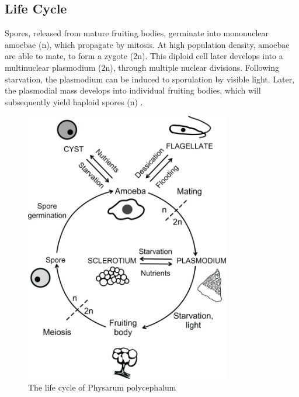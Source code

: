 \subsection{Life Cycle}
Spores, released from mature fruiting bodies, germinate into mononuclear amoebae (n), which propagate by mitosis. At high population density, amoebae are able to mate, to form a zygote (2n). This diploid cell later develops into a multinuclear plasmodium (2n), through multiple nuclear divisions. Following starvation, the plasmodium can be induced to sporulation by visible light. Later, the plasmodial mass develops into individual fruiting bodies, which will subsequently yield haploid spores (n) \cite{physlf}.

\begin{figure}
  \centering
    \includegraphics[width=0.8\textwidth]{physarum_life_cycle}%
    
  \caption{The life cycle of Physarum polycephalum\cite{physlf}}
  \label{fig:hex_n}
\end{figure}


